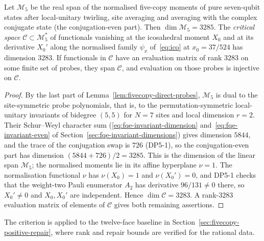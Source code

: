 \begin{proposition}
\label{prop:fivecopy-finite-probes}
Let $\mathcal M_5$ be the real span of the normalised five-copy moments
of pure seven-qubit states after local-unitary twirling, site averaging
and averaging with the complex conjugate state (the conjugation-even
part). Then $\dim\mathcal M_5=3285$. The \emph{critical space}
$\mathcal C\subset\mathcal M_5^*$ of functionals vanishing at the
icosahedral moment $X_0$ and at its derivative $X_0'$ along the
normalised family $\psi_x$ of~\eqref{eq:ico} at $x_0=37/524$ has
dimension $3283$. If functionals in $\mathcal C$ have an evaluation
matrix of rank $3283$ on some finite set of probes, they span
$\mathcal C$, and evaluation on those probes is injective on
$\mathcal C$.
\end{proposition}
\begin{proof}
By the last part of Lemma~\ref{lem:fivecopy-direct-probes}, $\mathcal M_5$
is dual to the site-symmetric probe polynomials, that is, to the permutation-symmetric local-unitary
invariants of bidegree $(5,5)$ for $N=7$ sites and local dimension $r=2$. Their Schur--Weyl character sum
(\eqref{eq:fqe-invariant-dimension} and~\eqref{eq:fqe-invariant-even} of
Section~\ref{sec:fqe-invariant-dimensions}) gives dimension $5844$, and the trace of the conjugation swap is
$726$ (DP5-1), so the conjugation-even part has dimension
$(5844+726)/2=3285$. This is the dimension of the linear span $\mathcal M_5$; the normalised moments
lie in its affine hyperplane $\nu=1$. The normalisation functional $\nu$ has
$\nu(X_0)=1$ and $\nu(X_0')=0$, and DP5-1 checks that the weight-two Pauli enumerator
$A_2$ has derivative $96/131\ne0$ there, so $X_0'\ne0$ and $X_0,X_0'$ are independent. Hence
$\dim\mathcal C=3283$. A rank-$3283$ evaluation matrix of elements of
$\mathcal C$ gives both remaining assertions.
\end{proof}

The criterion is applied to the twelve-face baseline in
Section~\ref{sec:fivecopy-positive-repair}, where rank and repair bounds
are verified for the rational data.
